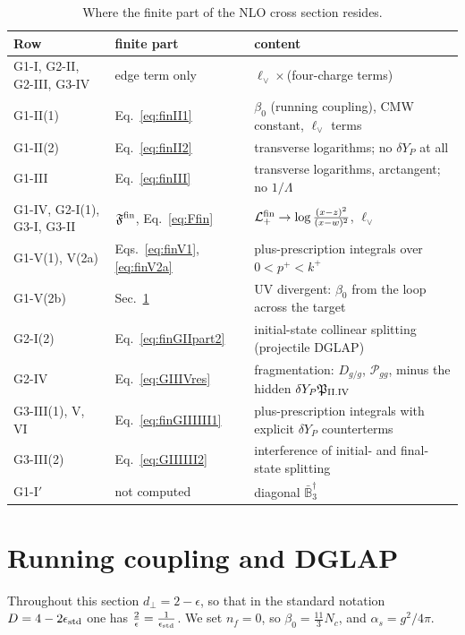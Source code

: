\documentclass[aps,prd,onecolumn,superscriptaddress,nofootinbib,floatfix,longbibliography,11pt]{revtex4-2}
\numberwithin{equation}{section}
\def\mf#1{\mathbb{#1}}
\newcommand{\lV}{\ell_{\vee}}
\newcommand{\Lp}{\mathcal{L}_{+}}
\begin{document}
\begin{table}[!tbp]
\centering
\renewcommand{\arraystretch}{1.2}
\begin{tabular}{L{3.7cm}L{3.5cm}L{7.4cm}}
\toprule
Row & finite part & content\\
\midrule
G1-I, G2-II, G2-III, G3-IV & edge term only & $\lV\times$(four-charge terms)\\
G1-II(1) & Eq.~\eqref{eq:finII1} & $\beta_0$ (running coupling), CMW constant, $\lV$ terms\\
G1-II(2) & Eq.~\eqref{eq:finII2} & transverse logarithms; no $\delta Y_P$ at all\\
G1-III & Eq.~\eqref{eq:finIII} & transverse logarithms, arctangent; no $1/\Lambda$\\
G1-IV, G2-I(1), G3-I, G3-II & $\mathfrak F^{\rm fin}$, Eq.~\eqref{eq:Ffin} & $\Lp^{\rm fin}\to\log\frac{(x-z)^2}{(x-w)^2}$, $\lV$\\
G1-V(1), V(2a) & Eqs.~\eqref{eq:finV1}, \eqref{eq:finV2a} & plus-prescription integrals over $0<p^+<k^+$\\
G1-V(2b) & Sec.~\ref{sec:rc} & UV divergent: $\beta_0$ from the loop across the target\\
G2-I(2) & Eq.~\eqref{eq:finGIIpart2} & initial-state collinear splitting (projectile DGLAP)\\
G2-IV & Eq.~\eqref{eq:GIIIVres} & fragmentation: $D_{g/g}$, $\mathcal P_{gg}$, minus the hidden $\delta Y_P\mathfrak P_{\rm II.IV}$\\
G3-III(1), V, VI & Eq.~\eqref{eq:finGIIIIII1} & plus-prescription integrals with explicit $\delta Y_P$ counterterms\\
G3-III(2) & Eq.~\eqref{eq:GIIIIII2} & interference of initial- and final-state splitting\\
G1-I$'$ & not computed & diagonal $\bar{\mf B}_3^\dagger$\\
\bottomrule
\end{tabular}
\caption{Where the finite part of the NLO cross section resides.}
\label{tab:fin}
\end{table}
\section{Running coupling and DGLAP}\label{sec:rc}

Throughout this section $d_\perp=2-\epsilon$, so that in the standard notation $D=4-2\epsilon_{\rm std}$ one has $\frac2\epsilon=\frac{1}{\epsilon_{\rm std}}$. We set $n_f=0$, so $\beta_0=\frac{11}{3}N_c$, and $\alpha_s=g^2/4\pi$.
\end{document}
